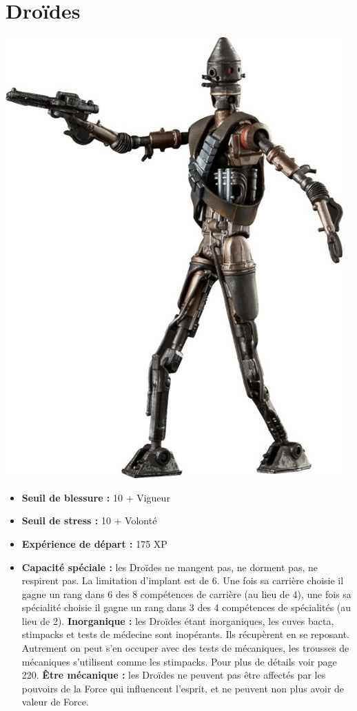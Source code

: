 \documentclass{article}
\begin{document}
\section*{Droïdes}
\noindent\begin{minipage}{0.3\textwidth}
	\includegraphics[width=1\linewidth]{../_img/species/droid}
\end{minipage}
\hfill
\begin{minipage}{0.7\textwidth}\raggedleft
	\begin{itemize}
		\item \textbf{Seuil de blessure :} 10 + Vigueur 
		\item \textbf{Seuil de stress :} 10 + Volonté 
		\item \textbf{Expérience de départ :} 175 XP
		\item \textbf{Capacité spéciale :} les Droïdes ne mangent pas, ne dorment pas, ne respirent pas. La limitation d'implant est de 6. Une fois sa carrière choisie il gagne un rang dans 6 des 8 compétences de carrière (au lieu de 4), une fois sa spécialité choisie il gagne un rang dans 3 des 4 compétences de spécialités (au lieu de 2). \textbf{Inorganique :} les Droïdes étant inorganiques, les cuves bacta, stimpacks et tests de médecine sont inopérants. Ils récupèrent en se reposant. Autrement on peut s'en occuper avec des tests de mécaniques, les trousses de mécaniques s'utilisent comme les stimpacks. Pour plus de détails voir page 220. \textbf{Être mécanique : }les Droïdes ne peuvent pas être affectés par les pouvoirs de la Force qui influencent l'esprit, et ne peuvent non plus avoir de valeur de Force.
	\end{itemize}
\end{minipage}
\end{document}
